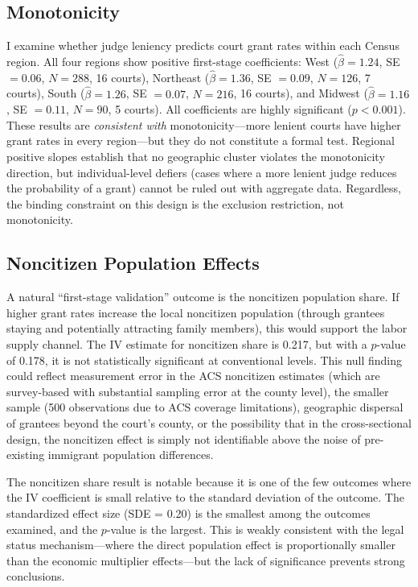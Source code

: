 \documentclass[12pt]{article}
\begin{document}
\subsection{Monotonicity}

I examine whether judge leniency predicts court grant rates within each Census region. All four regions show positive first-stage coefficients: West ($\hat{\beta} = 1.24$, SE $= 0.06$, $N = 288$, 16 courts), Northeast ($\hat{\beta} = 1.36$, SE $= 0.09$, $N = 126$, 7 courts), South ($\hat{\beta} = 1.26$, SE $= 0.07$, $N = 216$, 16 courts), and Midwest ($\hat{\beta} = 1.16$, SE $= 0.11$, $N = 90$, 5 courts). All coefficients are highly significant ($p < 0.001$). These results are \textit{consistent with} monotonicity---more lenient courts have higher grant rates in every region---but they do not constitute a formal test. Regional positive slopes establish that no geographic cluster violates the monotonicity direction, but individual-level defiers (cases where a more lenient judge reduces the probability of a grant) cannot be ruled out with aggregate data. Regardless, the binding constraint on this design is the exclusion restriction, not monotonicity.

\subsection{Noncitizen Population Effects}

A natural ``first-stage validation'' outcome is the noncitizen population share. If higher grant rates increase the local noncitizen population (through grantees staying and potentially attracting family members), this would support the labor supply channel. The IV estimate for noncitizen share is 0.217, but with a $p$-value of 0.178, it is not statistically significant at conventional levels. This null finding could reflect measurement error in the ACS noncitizen estimates (which are survey-based with substantial sampling error at the county level), the smaller sample (500 observations due to ACS coverage limitations), geographic dispersal of grantees beyond the court's county, or the possibility that in the cross-sectional design, the noncitizen effect is simply not identifiable above the noise of pre-existing immigrant population differences.

The noncitizen share result is notable because it is one of the few outcomes where the IV coefficient is small relative to the standard deviation of the outcome. The standardized effect size (SDE = 0.20) is the smallest among the outcomes examined, and the $p$-value is the largest. This is weakly consistent with the legal status mechanism---where the direct population effect is proportionally smaller than the economic multiplier effects---but the lack of significance prevents strong conclusions.
\end{document}
